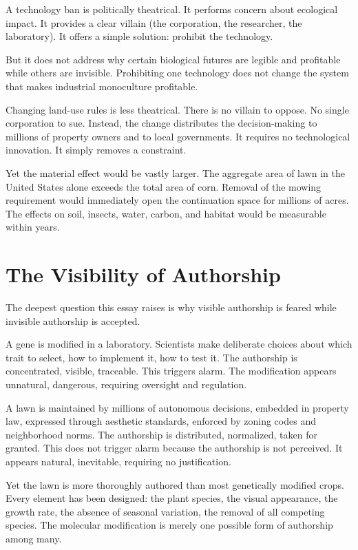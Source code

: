 \documentclass[12pt]{article}
\begin{document}
A technology ban is politically theatrical. It performs concern about ecological impact. It provides a clear villain (the corporation, the researcher, the laboratory). It offers a simple solution: prohibit the technology.

But it does not address why certain biological futures are legible and profitable while others are invisible. Prohibiting one technology does not change the system that makes industrial monoculture profitable.

Changing land-use rules is less theatrical. There is no villain to oppose. No single corporation to sue. Instead, the change distributes the decision-making to millions of property owners and to local governments. It requires no technological innovation. It simply removes a constraint.

Yet the material effect would be vastly larger. The aggregate area of lawn in the United States alone exceeds the total area of corn. Removal of the mowing requirement would immediately open the continuation space for millions of acres. The effects on soil, insects, water, carbon, and habitat would be measurable within years.

\section{The Visibility of Authorship}

The deepest question this essay raises is why visible authorship is feared while invisible authorship is accepted.

A gene is modified in a laboratory. Scientists make deliberate choices about which trait to select, how to implement it, how to test it. The authorship is concentrated, visible, traceable. This triggers alarm. The modification appears unnatural, dangerous, requiring oversight and regulation.

A lawn is maintained by millions of autonomous decisions, embedded in property law, expressed through aesthetic standards, enforced by zoning codes and neighborhood norms. The authorship is distributed, normalized, taken for granted. This does not trigger alarm because the authorship is not perceived. It appears natural, inevitable, requiring no justification.

Yet the lawn is more thoroughly authored than most genetically modified crops. Every element has been designed: the plant species, the visual appearance, the growth rate, the absence of seasonal variation, the removal of all competing species. The molecular modification is merely one possible form of authorship among many.
\end{document}
